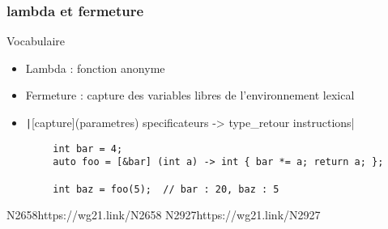 \documentclass[C++.tex]{subfiles}
\begin{document}
\begin{frame}[fragile]
	\frametitle{lambda et fermeture}
	\begin{block}{Vocabulaire}
		\begin{itemize}
			\item Lambda : fonction anonyme
			\item Fermeture : capture des variables libres de l'environnement lexical
		\end{itemize}
	\end{block}

	\begin{itemize}
		\item \texttt|[capture](parametres) specificateurs -> type_retour {instructions}|
	\end{itemize}

	\begin{verbatim}
		int bar = 4;
		auto foo = [&bar] (int a) -> int { bar *= a; return a; };

		int baz = foo(5);  // bar : 20, baz : 5
	\end{verbatim}

		{N2658}{https://wg21.link/N2658}
		{N2927}{https://wg21.link/N2927}
\end{frame}
\end{document}
